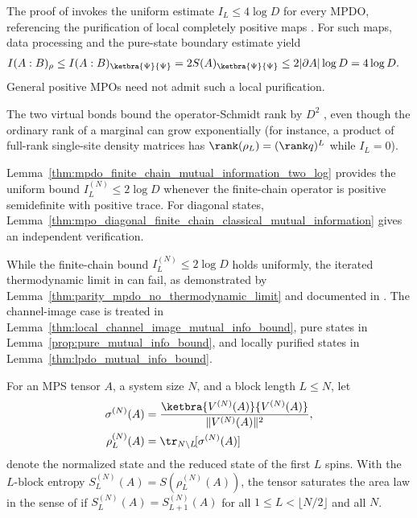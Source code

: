 \begin{remark}
    The proof of \cite[Proposition~4.5]{Cirac2016MPDO_arXiv} invokes the
    uniform estimate $I_L\leq4\log D$ for every MPDO, referencing the
    purification of local completely positive maps \cite{Wolf2008AreaLaws}.
    For such maps, data processing and the pure-state boundary estimate yield
    \begin{align}
        I(A:B)_{\rho}
         & \leq I(A:B)_{\ketbra{\Psi}{\Psi}}
        =2S(A)_{\ketbra{\Psi}{\Psi}}
        \leq2\lvert\partial A\rvert\log D = 4\log D.
        \notag
    \end{align}
    General positive MPOs need not admit such a local purification.

    The two virtual bonds bound the operator-Schmidt rank by $D^2$
    \cite[``Coefficient-space characterization of operator-Schmidt rank'']{QICLean2026Blueprint},
    even though the ordinary rank of a marginal can grow exponentially (for
    instance, a product of full-rank single-site density matrices has
    $\rank(\rho_L)=(\rank q)^L$ while $I_L=0$).

    Lemma~\ref{thm:mpdo_finite_chain_mutual_information_two_log} provides the
    uniform bound $I_L^{(N)}\leq2\log D$ whenever the finite-chain operator is
    positive semidefinite with positive trace. For diagonal states,
    Lemma~\ref{thm:mpo_diagonal_finite_chain_classical_mutual_information}
    gives an independent verification.

    While the finite-chain bound $I_L^{(N)}\leq 2\log D$ holds uniformly, the
    iterated thermodynamic limit in \cite[Proposition~4.5]{Cirac2016MPDO_arXiv}
    can fail, as demonstrated by Lemma~\ref{thm:parity_mpdo_no_thermodynamic_limit}
    and documented in \cite{gap:cpgsv17_mpdo_mutual_information_bound}.
    The channel-image case is treated in
    Lemma~\ref{thm:local_channel_image_mutual_info_bound}, pure states in
    Lemma~\ref{prop:pure_mutual_info_bound}, and locally purified states
    in Lemma~\ref{thm:lpdo_mutual_info_bound}.
\end{remark}

\begin{definition}
    \label{def:pure_sal}
    \leanok
    For an MPS tensor $A$, a system size $N$, and a block length $L\le N$, let
    \begin{align}
        \sigma^{(N)}(A)
         & =
        \frac{\ketbra{V^{(N)}(A)}{V^{(N)}(A)}}{\|V^{(N)}(A)\|^2},
        \notag                                    \\
        \rho_L^{(N)}(A)
         & =\tr_{N\setminus L}\![\sigma^{(N)}(A)]
        \notag
    \end{align}
    denote the normalized state and the reduced state of the first $L$ spins.
    With the $L$-block entropy $S_L^{(N)}(A)=S(\rho_L^{(N)}(A))$, the tensor
    saturates the area law in the sense of
    \cite[Definition~3.13, line~600]{Cirac2016MPDO_arXiv} if
    $S_L^{(N)}(A)=S_{L+1}^{(N)}(A)$ for all
    $1\le L<\lfloor N/2\rfloor$ and all $N$.
\end{definition}


